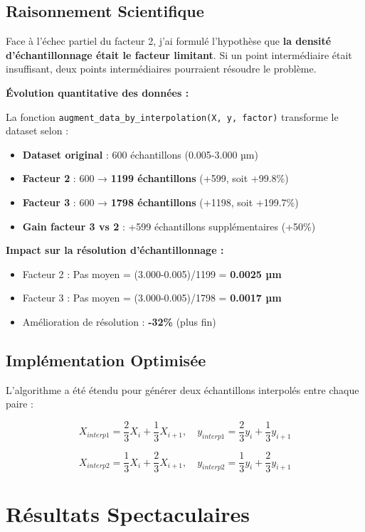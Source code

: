 \documentclass[11pt,a4paper,twocolumn]{article}
\begin{document}
\subsection{Raisonnement Scientifique}

Face à l'échec partiel du facteur 2, j'ai formulé l'hypothèse que \textbf{la densité d'échantillonnage était le facteur limitant}. Si un point intermédiaire était insuffisant, deux points intermédiaires pourraient résoudre le problème.

\textbf{Évolution quantitative des données :}

La fonction \texttt{augment\_data\_by\_interpolation(X, y, factor)} transforme le dataset selon :

\begin{itemize}
    \item \textbf{Dataset original} : 600 échantillons (0.005-3.000 µm)
    \item \textbf{Facteur 2} : 600 → \textbf{1199 échantillons} (+599, soit +99.8\%)
    \item \textbf{Facteur 3} : 600 → \textbf{1798 échantillons} (+1198, soit +199.7\%)
    \item \textbf{Gain facteur 3 vs 2} : +599 échantillons supplémentaires (+50\%)
\end{itemize}

\textbf{Impact sur la résolution d'échantillonnage :}
\begin{itemize}
    \item Facteur 2 : Pas moyen = (3.000-0.005)/1199 = \textbf{0.0025 µm}
    \item Facteur 3 : Pas moyen = (3.000-0.005)/1798 = \textbf{0.0017 µm}
    \item Amélioration de résolution : \textbf{-32\%} (plus fin)
\end{itemize}

\subsection{Implémentation Optimisée}

L'algorithme a été étendu pour générer deux échantillons interpolés entre chaque paire :

$$X_{interp1} = \frac{2}{3}X_i + \frac{1}{3}X_{i+1}, \quad y_{interp1} = \frac{2}{3}y_i + \frac{1}{3}y_{i+1}$$

$$X_{interp2} = \frac{1}{3}X_i + \frac{2}{3}X_{i+1}, \quad y_{interp2} = \frac{1}{3}y_i + \frac{2}{3}y_{i+1}$$

\section{Résultats Spectaculaires}
\end{document}
